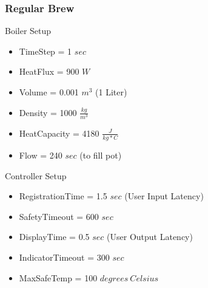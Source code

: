 \documentclass[10pt]{article}
\begin{document}
\subsubsection{Regular Brew}
\begin{multicols}{2}
Boiler Setup
\begin{itemize}
\item TimeStep = 1 $sec$
\item HeatFlux = 900 $W$
\item Volume = 0.001 $m^3$ (1 Liter)
\item Density = 1000 $\frac{kg}{m^3}$
\item HeatCapacity = 4180 $\frac{J}{kg*C}$
\item Flow = 240 $sec$ (to fill pot)
\end{itemize}

\columnbreak
Controller Setup
\begin{itemize}
\item RegistrationTime = 1.5 $sec$ (User Input Latency)
\item SafetyTimeout = 600 $sec$
\item DisplayTime = 0.5 $sec$ (User Output Latency)
\item IndicatorTimeout = 300 $sec$
\item MaxSafeTemp = 100 $degrees~Celsius$
\end{itemize}

\end{multicols}
\end{document}
